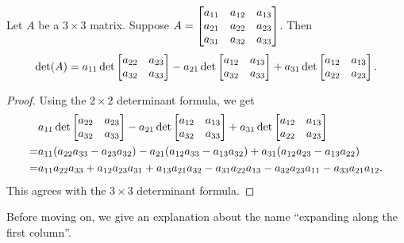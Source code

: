 \begin{theorem}
  Let \(A\) be a \(3\times 3\) matrix. Suppose \(A=\mat{a_{11} & a_{12} & a_{13} \\ a_{21} & a_{22} & a_{23} \\ a_{31} & a_{32} & a_{33}}\). Then \[\det(A)=a_{11}\det\mat{a_{22} & a_{23} \\ a_{32} & a_{33}}-a_{21}\det\mat{a_{12} & a_{13} \\ a_{32} & a_{33}}+a_{31}\det\mat{a_{12} & a_{13} \\ a_{22} & a_{23}}.\]
\end{theorem}
\begin{proof}
 Using the \(2\times 2\) determinant formula, we get
\begin{align*}
   & a_{11}\det\mat{a_{22} & a_{23} \\ a_{32} & a_{33}}-a_{21}\det\mat{a_{12} & a_{13} \\ a_{32} & a_{33}}+a_{31}\det\mat{a_{12} & a_{13} \\ a_{22} & a_{23}} \\
  = &a_{11}(a_{22}a_{33}-a_{23}a_{32})-a_{21}(a_{12}a_{33}-a_{13}a_{32})+a_{31}(a_{12}a_{23}-a_{13}a_{22})  \\
  = & a_{11}a_{22}a_{33}+a_{12}a_{23}a_{31}+a_{13}a_{21}a_{32}-a_{31}a_{22}a_{13}-a_{32}a_{23}a_{11}-a_{33}a_{21}a_{12}.
\end{align*}
This agrees with the \(3\times 3\) determinant formula.
\end{proof}

Before moving on, we give an explanation about the name ``expanding along the first column''.

